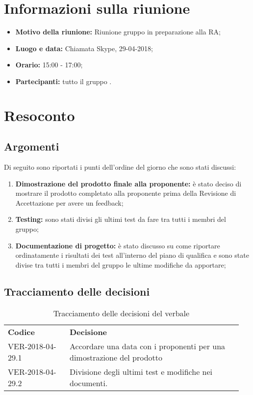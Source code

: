 \documentclass[VER-2018-04-29.tex]{subfiles}
\begin{document}
	

\chapter{Informazioni sulla riunione}
\begin{itemize}
	\item \textbf{Motivo della riunione:} Riunione gruppo in preparazione alla RA;
	\item \textbf{Luogo e data:} Chiamata Skype, 29-04-2018;
	\item \textbf{Orario:} 15:00 - 17:00;
	\item \textbf{Partecipanti:} tutto il gruppo \gruppo.
\end{itemize}



\chapter{Resoconto}
\section{Argomenti}
Di seguito sono riportati i punti dell'ordine del giorno che sono stati discussi:
\begin{enumerate}
	\item \textbf{Dimostrazione del prodotto finale alla proponente:} è stato deciso di mostrare il prodotto completato alla proponente prima della Revisione di Accettazione per avere un feedback;
	\item \textbf{Testing:} sono stati divisi gli ultimi test da fare tra tutti i membri del gruppo;
	\item \textbf{Documentazione di progetto:} è stato discusso su come riportare ordinatamente i risultati dei test all'interno del piano di qualifica e sono state divise tra tutti i membri del gruppo le ultime modifiche da apportare;
\end{enumerate}
\section{Tracciamento delle decisioni}
\begin{table}[H]
	\begin{center}
		\begin{tabu} to 
			\tableHeaderStyle
			\textbf{Codice} & \textbf{Decisione} \\
			VER-2018-04-29.1 & Accordare una data con i proponenti per una dimostrazione del prodotto \\
			VER-2018-04-29.2 & Divisione degli ultimi test e modifiche nei documenti. \\
		\end{tabu}
		\caption{Tracciamento delle decisioni del verbale}
	\end{center}
\end{table}
\end{document}
